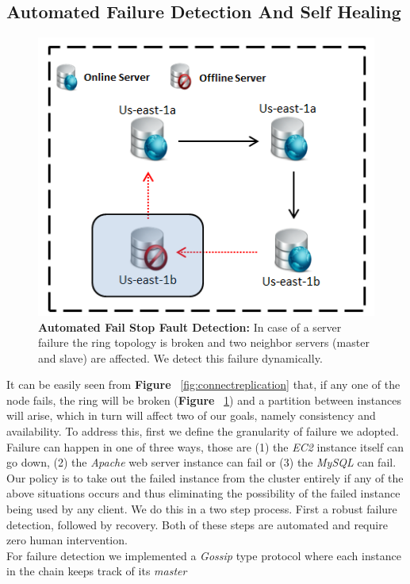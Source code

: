 \documentclass[12pt]{article}
\begin{document}
\subsection{Automated Failure Detection And Self Healing}
\label{fault}
\begin{figure}[H] \centering \includegraphics[scale=0.8]{Images/figure4.PNG}
\caption{\textbf{Automated Fail Stop Fault Detection:} In case of a server
failure the ring topology is broken and two neighbor servers (master and slave)
are affected. We detect this failure dynamically.} \label{fig:failuredetection}
\end{figure} It can be easily seen from \textbf{Figure
}~\ref{fig:connectreplication} that, if any one of the node fails, the ring will
be broken (\textbf{Figure }~\ref{fig:failuredetection}) and a partition between
instances will arise, which in turn will affect two of our goals, namely
consistency and availability. To address this, first we define the granularity
of failure we adopted. Failure can happen in one of three ways, those are (1)
the \emph{EC2} instance itself can go down, (2) the  \emph{Apache} web server
instance can fail or (3) the \emph{MySQL} can fail. Our policy is to take out
the failed instance from the cluster entirely if any of the above situations
occurs and thus eliminating the possibility of the failed instance being used by
any client. We do this in a two step process. First a robust failure detection,
followed by recovery. Both of these steps are automated and require zero human
intervention. \\ For failure detection we implemented a \emph{Gossip} type
protocol where each instance in the chain keeps track of its \emph{master}
\end{document}
